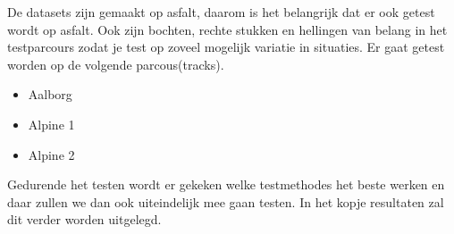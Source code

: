 De datasets zijn gemaakt op asfalt, daarom is het belangrijk dat er ook getest wordt op asfalt. Ook zijn bochten, rechte stukken en hellingen van belang in het testparcours zodat je test op zoveel mogelijk variatie in situaties. Er gaat getest worden op de volgende parcous(tracks).
\begin{itemize}
\item Aalborg
\item Alpine 1
\item Alpine 2
\end{itemize}
Gedurende het testen wordt er gekeken welke testmethodes het beste werken en daar zullen we dan ook uiteindelijk mee gaan testen. In het kopje resultaten zal dit verder worden uitgelegd. 
